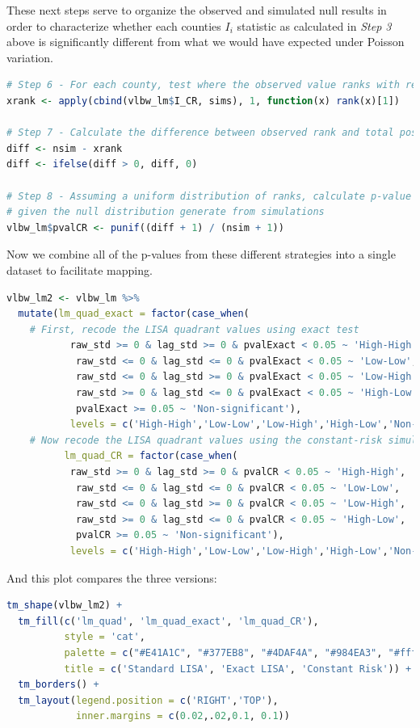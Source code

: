 \documentclass[
]{book}
\begin{document}
These next steps serve to organize the observed and simulated null results in order to characterize whether each counties \(I_i\) statistic as calculated in \emph{Step 3} above is significantly different from what we would have expected under Poisson variation.

\begin{lstlisting}[language=R]
# Step 6 - For each county, test where the observed value ranks with respect to the null simulations
xrank <- apply(cbind(vlbw_lm$I_CR, sims), 1, function(x) rank(x)[1])

# Step 7 - Calculate the difference between observed rank and total possible (nsim)
diff <- nsim - xrank
diff <- ifelse(diff > 0, diff, 0)

# Step 8 - Assuming a uniform distribution of ranks, calculate p-value for observed
# given the null distribution generate from simulations
vlbw_lm$pvalCR <- punif((diff + 1) / (nsim + 1))
\end{lstlisting}

Now we combine all of the p-values from these different strategies into a single dataset to facilitate mapping.

\begin{lstlisting}[language=R]
vlbw_lm2 <- vlbw_lm %>%
  mutate(lm_quad_exact = factor(case_when(
    # First, recode the LISA quadrant values using exact test
           raw_std >= 0 & lag_std >= 0 & pvalExact < 0.05 ~ 'High-High',
            raw_std <= 0 & lag_std <= 0 & pvalExact < 0.05 ~ 'Low-Low',
            raw_std <= 0 & lag_std >= 0 & pvalExact < 0.05 ~ 'Low-High',
            raw_std >= 0 & lag_std <= 0 & pvalExact < 0.05 ~ 'High-Low',
            pvalExact >= 0.05 ~ 'Non-significant'),
           levels = c('High-High','Low-Low','Low-High','High-Low','Non-significant')),
    # Now recode the LISA quadrant values using the constant-risk simulation
          lm_quad_CR = factor(case_when(
           raw_std >= 0 & lag_std >= 0 & pvalCR < 0.05 ~ 'High-High',
            raw_std <= 0 & lag_std <= 0 & pvalCR < 0.05 ~ 'Low-Low',
            raw_std <= 0 & lag_std >= 0 & pvalCR < 0.05 ~ 'Low-High',
            raw_std >= 0 & lag_std <= 0 & pvalCR < 0.05 ~ 'High-Low',
            pvalCR >= 0.05 ~ 'Non-significant'),
           levels = c('High-High','Low-Low','Low-High','High-Low','Non-significant')))
\end{lstlisting}

And this plot compares the three versions:

\begin{lstlisting}[language=R]
tm_shape(vlbw_lm2) + 
  tm_fill(c('lm_quad', 'lm_quad_exact', 'lm_quad_CR'),
          style = 'cat',
          palette = c("#E41A1C", "#377EB8", "#4DAF4A", "#984EA3", "#ffffb3"),
          title = c('Standard LISA', 'Exact LISA', 'Constant Risk')) +
  tm_borders() +
  tm_layout(legend.position = c('RIGHT','TOP'),
            inner.margins = c(0.02,.02,0.1, 0.1))
\end{lstlisting}
\end{document}
